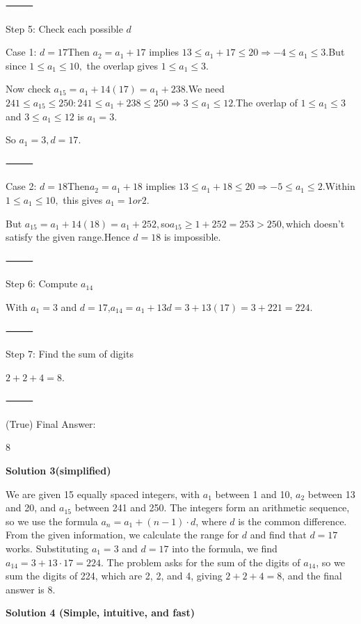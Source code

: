 \begin{enumerate}
 ⸻

 Step 5: Check each possible $d$

 Case 1: $d = 17$Then $a_2 = a_1 + 17$ implies $13 \le a_1 + 17 \le 20 \Rightarrow -4 \le a_1 \le 3.$But since $1 \le a_1 \le 10,$ the overlap gives $1 \le a_1 \le 3.$

 Now check $a_{15} = a_1 + 14(17) = a_1 + 238.$We need $241 \le a_{15} \le 250: 241 \le a_1 + 238 \le 250 \Rightarrow 3 \le a_1 \le 12.$The overlap of $1 \le a_1 \le 3$ and $3 \le a_1 \le 12$ is $a_1 = 3.$

 So $a_1 = 3, d = 17.$

 ⸻

 Case 2: $d = 18$Then$a_2 = a_1 + 18$ implies $13 \le a_1 + 18 \le 20 \Rightarrow -5 \le a_1 \le 2.$Within $1 \le a_1 \le 10,$ this gives $a_1 = 1 or 2.$

 But $a_{15} = a_1 + 14(18) = a_1 + 252,$so$a_{15} \ge 1 + 252 = 253 > 250,$which doesn’t satisfy the given range.Hence $d = 18$ is impossible.

 ⸻

 Step 6: Compute $a_{14}$

 With $a_1 = 3$ and $d = 17$,$a_{14} = a_1 + 13d = 3 + 13(17) = 3 + 221 = 224.$

 ⸻

 Step 7: Find the sum of digits

 $2 + 2 + 4 = 8.$

 ⸻

 (True) Final Answer:

 $\boxed{8}$




\textbf{Solution 3(simplified)}

We are given 15 equally spaced integers, with \( a_1 \) between 1 and 10, \( a_2 \) between 13 and 20, and \( a_{15} \) between 241 and 250. The integers form an arithmetic sequence, so we use the formula \( a_n = a_1 + (n-1) \cdot d \), where \( d \) is the common difference. From the given information, we calculate the range for \( d \) and find that \( d = 17 \) works. Substituting \( a_1 = 3 \) and \( d = 17 \) into the formula, we find \( a_{14} = 3 + 13 \cdot 17 = 224 \). The problem asks for the sum of the digits of \( a_{14} \), so we sum the digits of 224, which are 2, 2, and 4, giving \( 2 + 2 + 4 = 8 \), and the final answer is \( \boxed{8} \).

 



\textbf{Solution 4 (Simple, intuitive, and fast)}


\end{enumerate}
